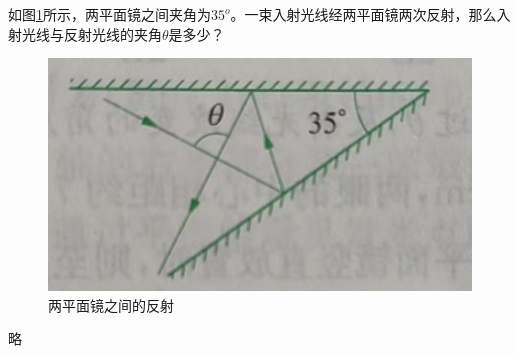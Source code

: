 \documentclass[windows,csize4]{BHCexam}
\begin{document}
\begin{groups}
\begin{questions}[]
        \question[5] 如图\ref{fig:fig_3_16}所示，两平面镜之间夹角为$35^o$。一束入射光线经两平面镜两次反射，那么入射光线与反射光线的夹角$\theta$是多少？
        \begin{figure}[htb]
            \centering
            \includegraphics [scale=0.75,trim=0 0 0 0]{./image/fig_3_16.PNG}
            \caption{两平面镜之间的反射}
            \label{fig:fig_3_16}
        \end{figure}
        \begin{solution}{0.5cm}
            \methodonly  略
        \end{solution}
    \end{questions}
\end{groups}
\end{document}
